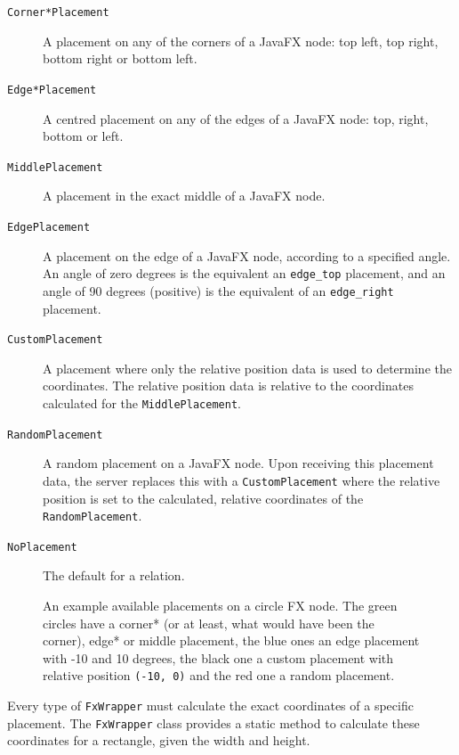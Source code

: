 \documentclass[a4paper]{article}
\begin{document}
	\begin{description}
		\item[\texttt{Corner*Placement}] A placement on any of the corners of a JavaFX node: top left, top right, bottom right or bottom left.
		\item[\texttt{Edge*Placement}]  A centred placement on any of the edges of a JavaFX node: top, right, bottom or left.
		\item[\texttt{MiddlePlacement}] A placement in the exact middle of a JavaFX node.
		\item[\texttt{EdgePlacement}]   A placement on the edge of a JavaFX node, according to a specified angle. An angle of zero degrees is the equivalent an \lstinline{edge_top} placement, and an angle of 90 degrees (positive) is the equivalent of an \lstinline{edge_right} placement. 
		\item[\texttt{CustomPlacement}] A placement where only the relative position data is used to determine the coordinates. The relative position data is relative to the coordinates calculated for the \lstinline{MiddlePlacement}.
		\item[\texttt{RandomPlacement}] A random placement on a JavaFX node. Upon receiving this placement data, the server replaces this with a \lstinline{CustomPlacement} where the relative position is set to the calculated, relative coordinates of the \lstinline{RandomPlacement}.
		\item[\texttt{NoPlacement}] The default for a relation.
	\end{description}
	
	\begin{figure}[!ht]
		\centering
		\caption{An example available placements on a circle FX node. The green circles have a corner* (or at least, what would have been the corner), edge* or middle placement, the blue ones an edge placement with -10 and 10 degrees, the black one a custom placement with relative position \lstinline{(-10, 0)} and the red one a random placement.}
		\label{fig:placements}
	\end{figure}
	Every type of \lstinline{FxWrapper} must calculate the exact coordinates of a specific placement. The \lstinline{FxWrapper} class provides a static method to calculate these coordinates for a rectangle, given the width and height.
	
\end{document}
